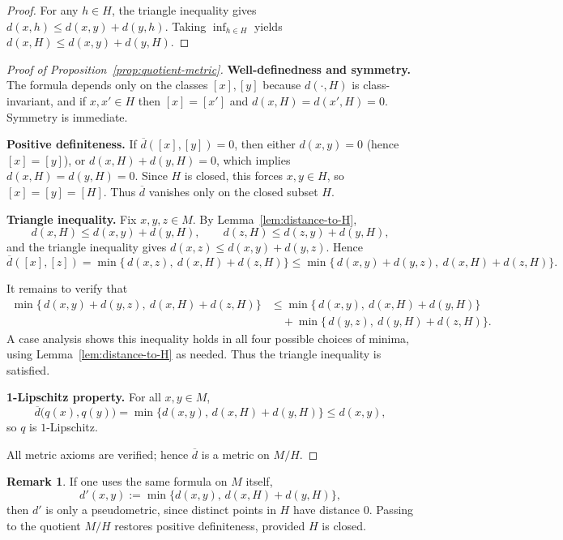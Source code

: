 \documentclass[10pt,a4paper]{article}
\theoremstyle{definition}
\newtheorem{remark}[theorem]{Remark}
\begin{document}
\begin{proof}
For any $h\in H$, the triangle inequality gives $d(x,h)\le d(x,y)+d(y,h)$.
Taking $\inf_{h\in H}$ yields $d(x,H)\le d(x,y)+d(y,H)$.
\end{proof}

\begin{proof}[Proof of Proposition~\ref{prop:quotient-metric}]
\noindent\textbf{Well-definedness and symmetry.}
The formula depends only on the classes $[x],[y]$ because $d(\cdot,H)$ is class-invariant, and if $x,x'\in H$ then $[x]=[x']$ and $d(x,H)=d(x',H)=0$. Symmetry is immediate.

\noindent\textbf{Positive definiteness.}
If $\overline d([x],[y])=0$, then either $d(x,y)=0$ (hence $[x]=[y]$), or $d(x,H)+d(y,H)=0$, which implies $d(x,H)=d(y,H)=0$. Since $H$ is closed, this forces $x,y\in H$, so $[x]=[y]=[H]$. Thus $\overline d$ vanishes only on the closed subset $H$.

\noindent\textbf{Triangle inequality.}
Fix $x,y,z\in M$. By Lemma~\ref{lem:distance-to-H},
\[
d(x,H)\le d(x,y)+d(y,H),\qquad d(z,H)\le d(z,y)+d(y,H),
\]
and the triangle inequality gives $d(x,z)\le d(x,y)+d(y,z)$. Hence
\[
\overline d([x],[z])
=\min\{\,d(x,z),\ d(x,H)+d(z,H)\}
\le \min\{\,d(x,y)+d(y,z),\ d(x,H)+d(z,H)\}.
\]

It remains to verify that
\begin{align}\label{eq:key}
\min\{\,d(x,y)+d(y,z),\ d(x,H)+d(z,H)\}
&\le \min\{\,d(x,y),\ d(x,H)+d(y,H)\}  \\
&\quad + \min\{\,d(y,z),\ d(y,H)+d(z,H)\}. \nonumber
\end{align}
A case analysis shows this inequality holds in all four possible choices of minima,
using Lemma~\ref{lem:distance-to-H} as needed. Thus the triangle inequality is satisfied.

\noindent\textbf{1-Lipschitz property.}
For all $x,y\in M$,
\[
\overline d\big(q(x),q(y)\big)=\min\{d(x,y),\,d(x,H)+d(y,H)\}\le d(x,y),
\]
so $q$ is $1$-Lipschitz.

All metric axioms are verified; hence $\overline d$ is a metric on $M/H$.
\end{proof}

\begin{remark}
If one uses the same formula on $M$ itself,
\[
d'(x,y):=\min\{d(x,y),\,d(x,H)+d(y,H)\},
\]
then $d'$ is only a pseudometric, since distinct points in $H$ have distance $0$.
Passing to the quotient $M/H$ restores positive definiteness, provided $H$ is closed.
\end{remark}
\end{document}
